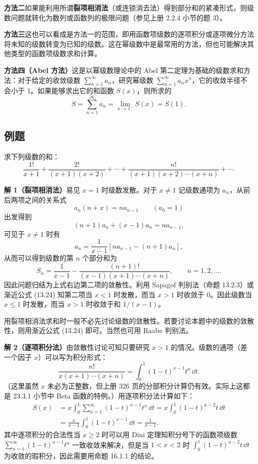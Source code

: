 \textbf{方法二}\quad 如果能利用所谓\textbf{裂项相消法}（或连锁消去法）得到部分和的紧凑形式，则级数问题就转化为数列或函数列的极限问题（参见上册 2.2.4 小节的题 3）。

\textbf{方法三}\quad 这也可以看成是方法一的范围，即用函数项级数的逐项积分或逐项微分方法将未知的级数转变为已知的级数。这在幂级数中是最常用的方法，但也可能解决其他类型的函数项级数求和计算。

\textbf{方法四（Abel 方法）}\quad 这是以幂级数理论中的 Abel 第二定理为基础的级数求和方法：对于给定的收敛级数 $\sum_{n=1}^{\infty}a_n$，研究幂级数 $\sum_{n=1}^{\infty}a_nx^n$，它的收敛半径不会小于 1。如果能够求出它的和函数 $S(x)$，则所求的
\[
  S=\sum_{n=1}^{\infty}a_n=\lim_{x\to1^-}S(x)=S(1).
\]

\subsection{例题}

\begin{xexample}[16.2.1]
求下列级数的和：
\[
  \frac{1!}{x+1}+\frac{2!}{(x+1)(x+2)}+\cdots
  +\frac{n!}{(x+1)(x+2)\cdots(x+n)}+\cdots.
\]
\end{xexample}

\begin{xsolution}
\textbf{解 1（裂项相消法）}\quad 易见 $x=1$ 时级数发散。对于 $x\ne1$ 记级数通项为 $a_n$，从前后两项之间的关系式
\[
  a_n(n+x)=na_{n-1}\qquad(a_0=1)
\]
出发得到
\[
  (n+1)a_n+(x-1)a_n=na_{n-1},
\]
可见于 $x\ne1$ 时有
\[
  a_n=\frac1{x-1}[na_{n-1}-(n+1)a_n],
\]
从而可以得到级数的第 $n$ 个部分和为
\[
  S_n=\frac1{x-1}-\frac{(n+1)!}{(x-1)(x+1)\cdots(x+n)},
  \qquad n=1,2,\ldots.
\]
因此问题归结为上式右边第二项的敛散性。利用 Sapagof 判别法（命题 13.2.3）或渐近公式 (13.24) 知第二项当 $x<1$ 时发散，而当 $x>1$ 时收敛于 0。因此级数当 $x\leqslant1$ 时发散，而当 $x>1$ 时收敛于和 $1/(x-1)$。

\begin{xremark}
用裂项相消法求和时一般不必先讨论级数的敛散性。若要讨论本题中的级数的敛散性，则用渐近公式 (13.24) 即可。当然也可用 Raabe 判别法。
\end{xremark}

\textbf{解 2（逐项积分法）}\quad 由敛散性讨论可知只要研究 $x>1$ 的情况。级数的通项（差一个因子 $x$）可以写为积分形式：
\[
  \frac{n!}{x(x+1)\cdots(x+n)}=\int_0^1(1-t)^{x-1}t^n\,\dd t.
\]
（这里虽然 $x$ 未必为正整数，但上册 326 页的分部积分计算仍有效。实际上这都是 23.3.1 小节中 Beta 函数的特例。）用逐项积分法计算如下：
\[
\begin{aligned}
  S(x)&=x\int_0^1\sum_{n=1}^{\infty}(1-t)^{x-1}t^n\,\dd t
      =x\int_0^1(1-t)^{x-2}t\,\dd t\\
  &=\frac{x}{x-1}\int_0^1(1-t)^{x-1}\,\dd t
      =\frac1{x-1}.
\end{aligned}
\]
其中逐项积分的合法性当 $x\geqslant2$ 时可以用 Dini 定理知积分号下的函数项级数 $\sum_{n=1}^{\infty}(1-t)^{x-1}t^n$ 一致收敛来解决，但是当 $1<x<2$ 时 $\int_0^1(1-t)^{x-2}t\,\dd t$ 为收敛的瑕积分，因此需要用命题 16.1.1 的结论。
\end{xsolution}

